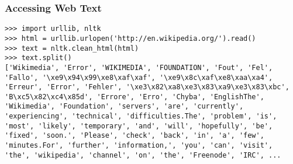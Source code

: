 \begin{frame}[fragile]\frametitle{Accessing Web Text}


\begin{lstlisting}
>>> import urllib, nltk
>>> html = urllib.urlopen('http://en.wikipedia.org/').read()
>>> text = nltk.clean_html(html)
>>> text.split()
['Wikimedia', 'Error', 'WIKIMEDIA', 'FOUNDATION', 'Fout', 'Fel',
'Fallo', '\xe9\x94\x99\xe8\xaf\xaf', '\xe9\x8c\xaf\xe8\xaa\xa4',
'Erreur', 'Error', 'Fehler', '\xe3\x82\xa8\xe3\x83\xa9\xe3\x83\xbc',
'B\xc5\x82\xc4\x85d', 'Errore', 'Erro', 'Chyba', 'EnglishThe',
'Wikimedia', 'Foundation', 'servers', 'are', 'currently',
'experiencing', 'technical', 'difficulties.The', 'problem', 'is',
'most', 'likely', 'temporary', 'and', 'will', 'hopefully', 'be',
'fixed', 'soon.', 'Please', 'check', 'back', 'in', 'a', 'few',
'minutes.For', 'further', 'information,', 'you', 'can', 'visit',
'the', 'wikipedia', 'channel', 'on', 'the', 'Freenode', 'IRC', ...
\end{lstlisting}
\end{frame}






%
%
%
%

